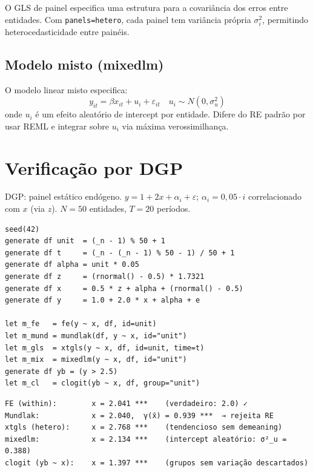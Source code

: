 O GLS de painel especifica uma estrutura para a covariância dos erros entre
entidades. Com \texttt{panels=hetero}, cada painel tem variância própria
$\sigma_i^2$, permitindo heterocedasticidade entre painéis.

\subsection*{Modelo misto (mixedlm)}

O modelo linear misto especifica:
\[
  y_{it} = \beta x_{it} + u_i + \varepsilon_{it} \quad u_i \sim N(0, \sigma_u^2)
\]
onde $u_i$ é um efeito aleatório de intercept por entidade. Difere do RE
padrão por usar REML e integrar sobre $u_i$ via máxima verossimilhança.

\section{Verificação por DGP}

DGP: painel estático endógeno. $y = 1 + 2x + \alpha_i + \varepsilon$;
$\alpha_i = 0{,}05 \cdot i$ correlacionado com $x$ (via $z$).
$N = 50$ entidades, $T = 20$ períodos.

\begin{lstlisting}[caption={Painel II: FE, Mundlak, xtgls, mixedlm, clogit}]
seed(42)
generate df unit  = (_n - 1) % 50 + 1
generate df t     = (_n - (_n - 1) % 50 - 1) / 50 + 1
generate df alpha = unit * 0.05
generate df z     = (rnormal() - 0.5) * 1.7321
generate df x     = 0.5 * z + alpha + (rnormal() - 0.5)
generate df y     = 1.0 + 2.0 * x + alpha + e

let m_fe   = fe(y ~ x, df, id=unit)
let m_mund = mundlak(df, y ~ x, id="unit")
let m_gls  = xtgls(y ~ x, df, id=unit, time=t)
let m_mix  = mixedlm(y ~ x, df, id="unit")
generate df yb = (y > 2.5)
let m_cl   = clogit(yb ~ x, df, group="unit")
\end{lstlisting}

\begin{lstlisting}[language={}, basicstyle=\ttfamily\small, frame=none,
  numbers=none, backgroundcolor=\color{codbg}]
FE (within):        x = 2.041 ***    (verdadeiro: 2.0) ✓
Mundlak:            x = 2.040,  γ(x̄) = 0.939 ***  → rejeita RE
xtgls (hetero):     x = 2.768 ***    (tendencioso sem demeaning)
mixedlm:            x = 2.134 ***    (intercept aleatório: σ²_u = 0.388)
clogit (yb ~ x):    x = 1.397 ***    (grupos sem variação descartados)
\end{lstlisting}


